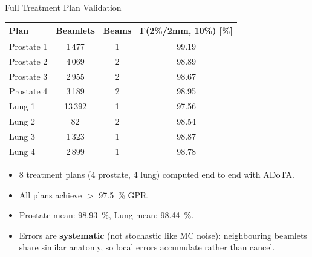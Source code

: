 \documentclass[aspectratio=169, 10pt]{beamer}
\begin{document}
\begin{frame}{Full Treatment Plan Validation}
  \begin{table}
    \centering\small
    \begin{tabular}{lccc}
      \toprule
      \textbf{Plan} & \textbf{Beamlets} & \textbf{Beams} &
        $\boldsymbol{\Gamma}$\textbf{(2\%/2mm, 10\%) [\%]} \\
      \midrule
      Prostate 1 & 1\,477 & 1 & 99.19 \\
      Prostate 2 & 4\,069 & 2 & 98.89 \\
      Prostate 3 & 2\,955 & 2 & 98.67 \\
      Prostate 4 & 3\,189 & 2 & 98.95 \\
      \midrule
      Lung 1     & 13\,392 & 1 & 97.56 \\
      Lung 2     & 82      & 2 & 98.54 \\
      Lung 3     & 1\,323  & 1 & 98.87 \\
      Lung 4     & 2\,899  & 1 & 98.78 \\
      \bottomrule
    \end{tabular}
  \end{table}

  \vspace{4pt}
  \begin{itemize}
    \item 8 treatment plans (4 prostate, 4 lung) computed end to end
          with ADoTA.
    \item All plans achieve $>$ \SI{97.5}{\percent} GPR.
    \item Prostate mean: \SI{98.93}{\percent}, Lung mean:
          \SI{98.44}{\percent}.
    \item Errors are \textbf{systematic} (not stochastic like MC noise):
          neighbouring beamlets share similar anatomy, so local errors
          accumulate rather than cancel.
  \end{itemize}
\end{frame}
\end{document}
